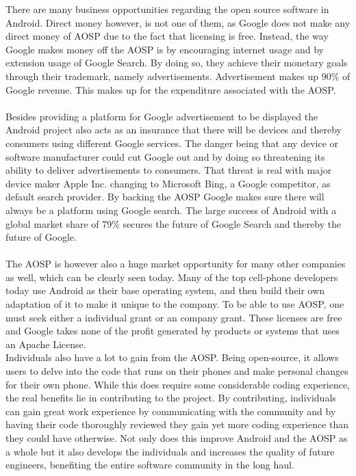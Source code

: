 \documentclass[conference]{IEEEtran}
\begin{document}
There are many business opportunities regarding the open source software in Android. Direct money however, is not one of them, as Google does not make any direct money of AOSP due to the fact that licensing is free.\cite{Money} Instead, the way Google makes money off the AOSP is by encouraging internet usage and by extension usage of Google Search. By doing so, they achieve their monetary goals through their trademark, namely advertisements. Advertisement makes up 90\% of Google revenue. \cite{google-revenue} This makes up for the expenditure associated with the AOSP. 
\\\\Besides providing a platform for Google advertisement to be displayed the Android project also acts as an insurance that there will be devices and thereby consumers using different Google services.\cite{moat} The danger being that any device or software manufacturer could cut Google out and by doing so threatening its ability to deliver advertisements to consumers. That threat is real with major device maker Apple Inc. changing to Microsoft Bing, a Google competitor, as default search provider. \cite{siri-bing} By backing the AOSP Google makes sure there will always be a platform using Google search. The large success of Android with a global market share of 79\% secures the future of Google Search and thereby the future of Google. \cite{Android-marketshare}
\\\\The AOSP is however also a huge market opportunity for many other companies as well, which can be clearly seen today. Many of the top cell-phone developers today use Android as their base operating system, and then build their own adaptation of it to make it unique to the company. To be able to use AOSP, one must seek either a individual grant or an company grant.\cite{Android-licenses} These licenses are free and Google takes none of the profit generated by products or systems that uses an Apache License.\\
Individuals also have a lot to gain from the AOSP. Being open-source, it allows users to delve into the code that runs on their phones and make personal changes for their own phone. While this does require some considerable coding experience, the real benefits lie in contributing to the project. By contributing, individuals can gain great work experience by communicating with the community and by having their code thoroughly reviewed they gain yet more coding experience than they could have otherwise. Not only does this improve Android and the AOSP as a whole but it also develops the individuals and increases the quality of future engineers, benefiting the entire software community in the long haul. 
\end{document}
